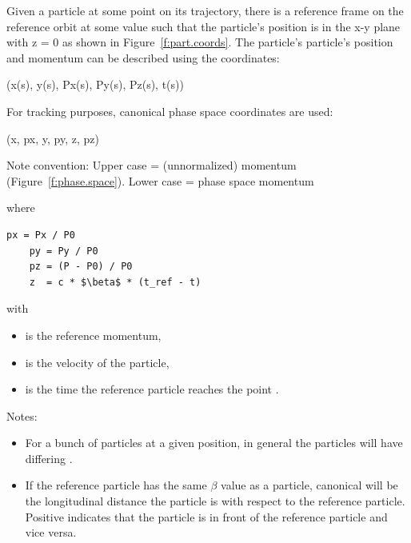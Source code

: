 \documentclass{hitec}
\begin{document}
Given a particle at some point on its trajectory, there is a reference frame on the reference orbit
at some  value such that the particle's position is in the x-y plane with z = 0 as shown
in Figure~\ref{f:part.coords}. The
particle's particle's position and momentum  can be described using the coordinates:
\begin{code}
    (x(s), y(s), Px(s), Py(s), Pz(s), t(s))
\end{code}

For tracking purposes, canonical phase space coordinates are used:
\begin{code}
    (x, px, y, py, z, pz)   
\end{code}
Note convention: Upper case  = (unnormalized) momentum (Figure~\ref{f:phase.space}). Lower
case  = phase space momentum

where
\begin{lstlisting}[mathescape]
    px = Px / P0
    py = Py / P0
    pz = (P - P0) / P0
    z  = c * $\beta$ * (t_ref - t)
\end{lstlisting}
with
\vspace{-10 pt}
\begin{itemize}
\item {} is the reference momentum, 
\item \vn{$\beta$} is the velocity of the particle, 
\item {} is the time the reference particle reaches the point .
\end{itemize}

Notes:
\vspace{-10 pt}
\begin{itemize}
\item 
For a bunch of particles at a given  position, in general the particles will have differing .
\item 
If the reference particle has the same $\beta$ value as a particle, canonical  will be the
longitudinal distance the particle is with respect to the reference particle. Positive 
indicates that the particle is in front of the reference particle and vice versa.
\end{itemize}
\end{document}
